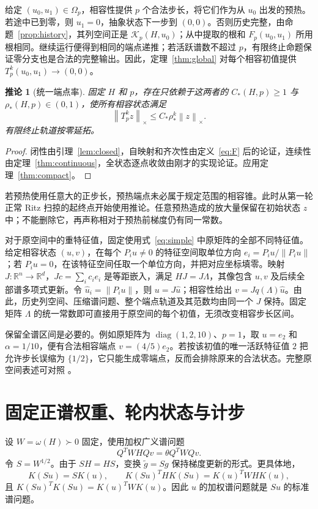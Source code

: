 \documentclass[UTF8,zihao=-4,a4paper]{ctexart}
\newtheorem{corollary}[theorem]{推论}
\theoremstyle{definition}\newtheorem{example}[theorem]{例}
\newcommand{\R}{\mathbb R}\newcommand{\N}{\mathbb N}
\newcommand{\norm}[1]{\left\lVert#1\right\rVert}
\newcommand{\K}{\mathcal K}\newcommand{\I}{\mathcal I}
\DeclareMathOperator{\diag}{diag}\DeclareMathOperator{\Span}{span}\DeclareMathOperator{\rank}{rank}
\begin{document}
给定 $(u_0,u_1)\in\Omega_p$，相容性提供 $p$ 个合法步长，将它们作为从 $u_0$ 出发的预热。若途中已到零，则 $u_1=0$，抽象状态下一步到 $(0,0)$。否则历史完整，由命题~\ref{prop:history}，其列空间正是 $\K_p(H,u_0)$；从中提取的根和 $F_p(u_0,u_1)$ 所用根相同。继续运行便得到相同的端点递推；若活跃谱数不超过 $p$，有限终止命题保证零分支也是合法的完整输出。因此，定理~\ref{thm:global} 对每个相容初值提供 $T_p^k(u_0,u_1)\to(0,0)$。

\begin{corollary}[统一端点率]\label{cor:endpoint}
固定 $H$ 和 $p$，存在只依赖于这两者的 $C_*(H,p)\ge1$ 与 $\rho_*(H,p)\in(0,1)$，使所有相容状态满足
\[
 \norm{T_p^kz}_\times\le C_*\rho_*^k\norm z_\times.
\]
有限终止轨道按零延拓。
\end{corollary}
\begin{proof}
闭性由引理~\ref{lem:closed}，自映射和齐次性由定义~\eqref{eq:F} 后的论证，连续性由定理~\ref{thm:continuous}，全状态逐点收敛由刚才的实现论证。应用定理~\ref{thm:compact}。
\end{proof}

若预热使用任意大的正步长，预热端点未必属于规定范围的相容锥。此时从第一轮正常 Ritz 扫掠的起终点开始使用推论。任意预热造成的放大量保留在初始状态 $z$ 中；不能删除它，再声称相对于预热前梯度仍有同一常数。

对于原空间中的重特征值，固定使用式~\eqref{eq:simple} 中原矩阵的全部不同特征值。给定相容状态 $(u,v)$，在每个 $P_i u\ne0$ 的特征空间取单位方向 $e_i=P_i u/\norm{P_i u}$；若 $P_i u=0$，在该特征空间任取一个单位方向，并把对应坐标填零。映射 $J:\R^n\to\R^d$，$Jc=\sum_i c_i e_i$ 是等距嵌入，满足 $HJ=J\Lambda$，其像包含 $u,v$ 及后续全部谱多项式更新。令 $\widehat u_i=\norm{P_i u}$，则 $u=J\widehat u$；相容性给出 $v=Jq(\Lambda)\widehat u$。由此，历史列空间、压缩谱问题、整个端点轨道及其范数均由同一个 $J$ 保持。固定矩阵 $\Lambda$ 的统一常数即可直接用于原空间的每个初值，无须改变相容步长区间。

保留全谱区间是必要的。例如原矩阵为 $\diag(1,2,10)$、$p=1$，取 $u=e_2$ 和 $\alpha=1/10$，便有合法相容端点 $v=(4/5)e_2$。若按该初值的唯一活跃特征值 $2$ 把允许步长误缩为 $\{1/2\}$，它只能生成零端点，反而会排除原来的合法状态。完整原空间表述可对照 \cite[Corollary 25]{YY2026}。

\section{固定正谱权重、轮内状态与计步}

设 $W=\omega(H)\succ0$ 固定，使用加权广义谱问题
\[
 Q^TWHQv=\theta Q^TWQv.
\]
令 $S=W^{1/2}$。由于 $SH=HS$，变换 $\widetilde g=Sg$ 保持梯度更新的形式。更具体地，
\[
 K(Su)=SK(u),\qquad
 K(Su)^THK(Su)=K(u)^TWHK(u),
\]
且 $K(Su)^TK(Su)=K(u)^TWK(u)$。因此 $u$ 的加权谱问题就是 $Su$ 的标准谱问题。
\end{document}
